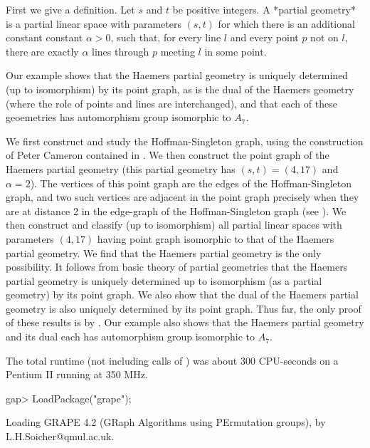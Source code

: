 First we give a definition. Let $s$ and $t$ be positive integers. A
*partial geometry* is a partial linear space with parameters $(s,t)$ for
which there is an additional constant constant $\alpha>0$, such that,
for every line $l$ and every point $p$ not on $l$, there are exactly
$\alpha$ lines through $p$ meeting $l$ in some point. 

Our example shows that the Haemers partial geometry \cite{Haemers81}
is uniquely determined (up to isomorphism) by its point graph, as is
the dual of the Haemers geometry (where the role of points and lines
are interchanged), and that each of these geoemetries has automorphism
group isomorphic to $A_7$.

We first construct and study the Hoffman-Singleton graph, using the
construction of Peter Cameron contained in \cite{Cam99}.  We then
construct the point graph of the Haemers partial geometry \cite{Haemers81}
(this partial geometry has $(s,t)=(4,17)$ and $\alpha=2$). The vertices
of this point graph are the edges of the Hoffman-Singleton graph, and
two such vertices are adjacent in the point graph precisely when they
are at distance 2 in the edge-graph of the Hoffman-Singleton graph (see
\cite{Haemers81}).  We then construct and classify (up to isomorphism)
all partial linear spaces with parameters $(4,17)$ having point graph
isomorphic to that of the Haemers partial geometry. We find that
the Haemers partial geometry is the only possibility. It follows from
basic theory of partial geometries that the Haemers partial geometry is
uniquely determined up to isomorphism (as a partial geometry) by its point
graph. We also show that the dual of the Haemers partial geometry is also
uniquely determined by its point graph. Thus far, the only proof of these
results is by {\GRAPE}. Our example also shows that the Haemers partial
geometry and its dual each has automorphism group isomorphic to $A_7$.

The total runtime (not including calls of {\nauty}) was about 300
CPU-seconds on a Pentium II running at 350 MHz.

\beginexample
gap> LoadPackage("grape");

Loading  GRAPE 4.2  (GRaph Algorithms using PErmutation groups),
by L.H.Soicher@qmul.ac.uk.

